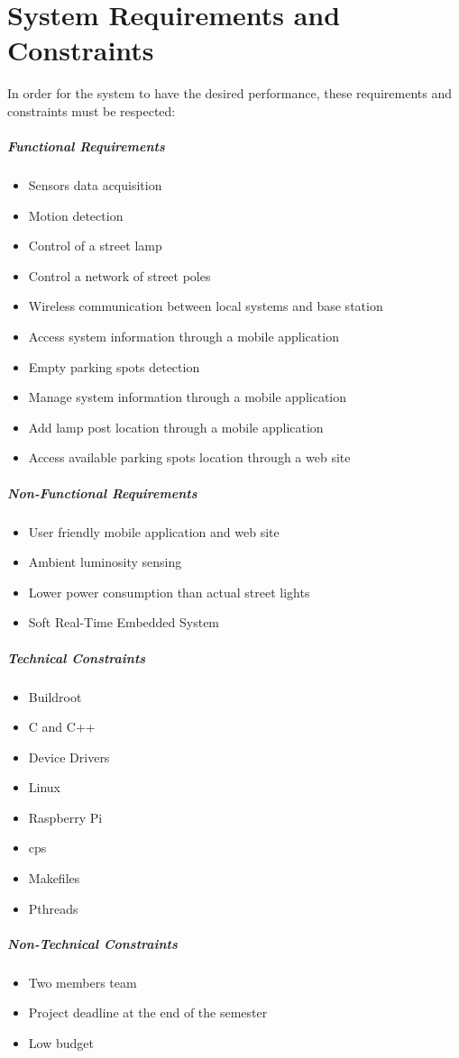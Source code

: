 \section{System Requirements and Constraints}
In order for the system to have the desired performance, these requirements and constraints must be respected:
\subparagraph{Functional Requirements}
\begin{itemize}
        \item Sensors data acquisition                          
        \item Motion detection
        \item Control of a street lamp
		\item Control a network of street poles
        \item Wireless communication between local systems and base station
		\item Access system information through a mobile application
        \item Empty parking spots detection
        \item Manage system information through a mobile application
        \item Add lamp post location through a mobile application
        \item Access available parking spots location through a web site
\end{itemize}
\subparagraph{Non-Functional Requirements}
\begin{itemize}
        \item User friendly mobile application and web site
        \item Ambient luminosity sensing
        \item Lower power consumption than actual street lights
        \item Soft Real-Time Embedded System
\end{itemize}
\subparagraph{Technical Constraints}
\begin{itemize}
        \item Buildroot
        \item C and C++ 
        \item Device Drivers
        \item Linux
        \item Raspberry Pi
        \item \ac{cps}
        \item Makefiles
        \item Pthreads
\end{itemize}
\subparagraph{Non-Technical Constraints}
\begin{itemize}
        \item Two members team
        \item Project deadline at the end of the semester
        \item Low budget
\end{itemize}
